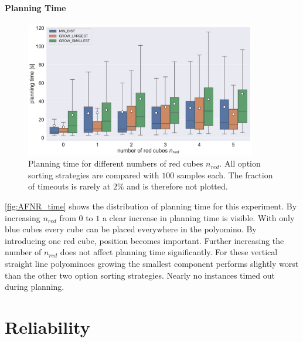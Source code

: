 \paragraph{Planning Time}

\begin{figure}
	\centering
	\includegraphics[width=0.9\textwidth]{figures/plots/AFNR_time.pdf}
	\caption[Planning time for number of red cubes]{Planning time for different numbers of red cubes $n_\textit{red}$. All option sorting strategies are compared with $100$ samples each. The fraction of timeouts is rarely at $2\%$ and is therefore not plotted.}
	\label{fig:AFNR_time}
\end{figure}


\autoref{fig:AFNR_time} shows the distribution of planning time for this experiment.
By increasing $n_\textit{red}$ from $0$ to $1$ a clear increase in planning time is visible.
With only blue cubes every cube can be placed everywhere in the polyomino.
By introducing one red cube, position becomes important.
Further increasing the number of $n_\textit{red}$ does not affect planning time significantly.
For these vertical straight line polyominoes growing the smallest component performs slightly worst than the other two option sorting strategies.
Nearly no instances timed out during planning. 


\section{Reliability}
\label{sec:AR}

